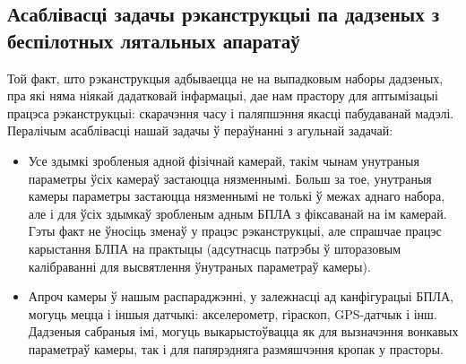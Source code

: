 \subsection*{Асаблівасці задачы рэканструкцыі па дадзеных з беспілотных лятальных апаратаў}
Той факт, што рэканструкцыя адбываецца не на выпадковым наборы дадзеных, пра які няма ніякай дадатковай інфармацыі, дае нам прастору для аптымізацыі працэса рэканструкцыі: скарачэння часу і паляпшэння якасці пабудаванай мадэлі. Пералічым асаблівасці нашай задачы ў пераўнанні з агульнай задачай:
\begin{itemize}
    \item Усе здымкі зробленыя адной фізічнай камерай, такім чынам унутраныя параметры ўсіх камераў застаюцца нязменнымі. Больш за тое, унутраныя камеры параметры застаюцца нязменнымі не толькі ў межах аднаго набора, але і для ўсіх здымкаў зробленым адным БПЛА з фіксаванай на ім камерай. Гэты факт не ўносіць зменаў у працэс рэканструкцыі, але спрашчае працэс карыстання БЛПА на практыцы (адсутнасць патрэбы ў шторазовым калібраванні для высвятлення ўнутраных параметраў камеры).
    \item Апроч камеры ў нашым распараджэнні, у залежнасці ад канфігурацыі БПЛА, могуць мецца і іншыя датчыкі: акселерометр, гіраскоп, GPS-датчык і інш. Дадзеныя сабраныя імі, могуць выкарыстоўвацца як для вызначэння вонкавых параметраў камеры, так і для папярэдняга размяшчэння кропак у прасторы.
\end{itemize}

